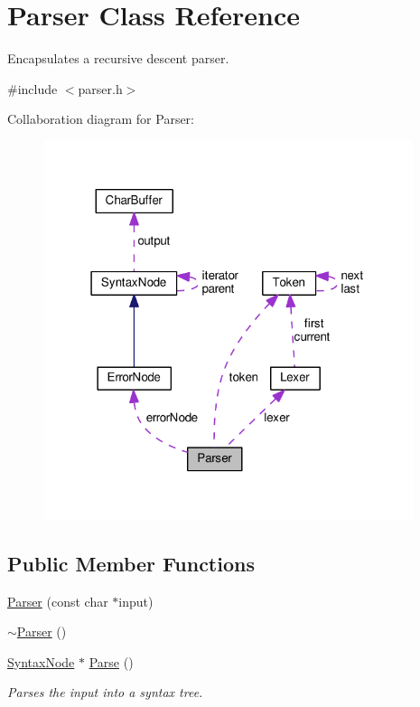 \hypertarget{classParser}{}\section{Parser Class Reference}
\label{classParser}


Encapsulates a recursive descent parser.  




{\ttfamily \#include $<$parser.\+h$>$}



Collaboration diagram for Parser\+:\nopagebreak
\begin{figure}[H]
\begin{center}
\leavevmode
\includegraphics[width=307pt]{classParser__coll__graph}
\end{center}
\end{figure}
\subsection*{Public Member Functions}
\begin{DoxyCompactItemize}
\item 
\hyperlink{classParser_a40600baa2c3d4262fd8b770a4615aed0}{Parser} (const char $\ast$input)
\item 
\hyperlink{classParser_a3e658b5917a93a3ef648050d060e3a93}{$\sim$\+Parser} ()
\item 
\hyperlink{classSyntaxNode}{Syntax\+Node} $\ast$ \hyperlink{classParser_a1861d1d9cc6165970cf07e07cacd11df}{Parse} ()
\begin{DoxyCompactList}\small\item\em Parses the input into a syntax tree. \end{DoxyCompactList}\end{DoxyCompactItemize}
